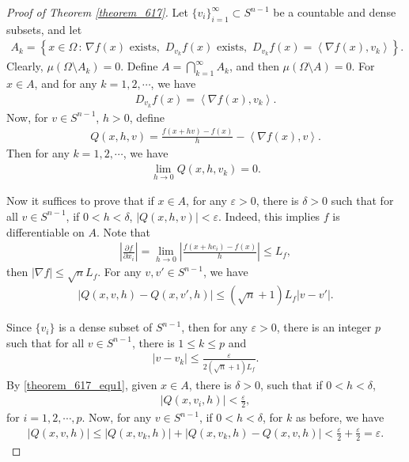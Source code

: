\documentclass[11pt]{book}
\theoremstyle{definition}
\numberwithin{equation}{chapter}
\begin{document}
\begin{proof}[Proof of Theorem \ref{theorem_617}]
Let $\{v_i\}^\infty_{i=1} \subset S^{n-1}$ be a countable and dense subsets, and let
\begin{align*}
    A_k = \left\{x \in \Omega \,:\, \nabla f(x)\,\,\text{exists},\,\, D_{v_k}f(x)\,\,\text{exists},\,\, D_{v_k}f(x) = \left\langle \nabla f(x), v_k \right\rangle \right\}.
\end{align*}
Clearly, $\mu(\Omega \setminus A_k) = 0$. Define $A = \bigcap^\infty_{k=1} A_k$, and then $\mu(\Omega \setminus A) = 0$. For $x \in A$, and for any $k = 1,2,\cdots$, we have
\begin{align*}
    D_{v_k}f(x) = \left\langle \nabla f(x), v_k \right\rangle.
\end{align*}
Now, for $v \in S^{n-1}$, $h > 0$, define
\begin{align*}
    Q(x,h,v) = \frac{f(x+hv) - f(x)}{h} - \left\langle \nabla f(x), v \right\rangle.
\end{align*}
Then for any $k = 1,2,\cdots$, we have
\begin{align}\label{theorem_617_equ1}
    \lim_{h\to 0} Q(x,h,v_k) = 0.
\end{align}

Now it suffices to prove that if $x \in A$, for any $\varepsilon > 0$, there is $\delta > 0$ such that for all $v \in S^{n-1}$, if $0 < h < \delta$, $\left|Q(x,h,v)\right| < \varepsilon$. Indeed, this implies $f$ is differentiable on $A$. Note that
\begin{align*}
    \left|\frac{\partial f}{\partial x_i}\right| = \lim_{h\to 0} \left|\frac{f(x + he_i) - f(x)}{h}\right| \leq L_f,
\end{align*}
then $\left|\nabla f\right| \leq \sqrt{n} L_f$. For any $v, v' \in S^{n-1}$, we have
\begin{align*}
    \left|Q(x,v,h) - Q(x,v',h)\right| \leq \left(\sqrt{n} + 1\right) L_f \left|v - v'\right|.
\end{align*}

Since $\{v_i\}$ is a dense subset of $S^{n-1}$, then for any $\varepsilon > 0$, there is an integer $p$ such that for all $v \in S^{n-1}$, there is $1 \leq k \leq p$ and 
\begin{align*}
    \left|v - v_k\right| \leq \frac{\varepsilon}{2 \left(\sqrt{n} + 1\right) L_f}.
\end{align*}
By \eqref{theorem_617_equ1}, given $x \in A$, there is $\delta > 0$, such that if $0 < h < \delta$,
\begin{align*}
    \left|Q(x,v_i,h)\right| < \frac{\varepsilon}{2},
\end{align*}
for $i = 1, 2, \cdots, p$. Now, for any $v \in S^{n-1}$, if $0 < h < \delta$, for $k$ as before, we have
\begin{align*}
    \left|Q(x,v,h)\right| \leq \left|Q(x,v_k,h)\right| + \left|Q(x,v_k,h) - Q(x,v,h)\right| < \frac{\varepsilon}{2} + \frac{\varepsilon}{2} = \varepsilon.
\end{align*}
\end{proof}
\end{document}
